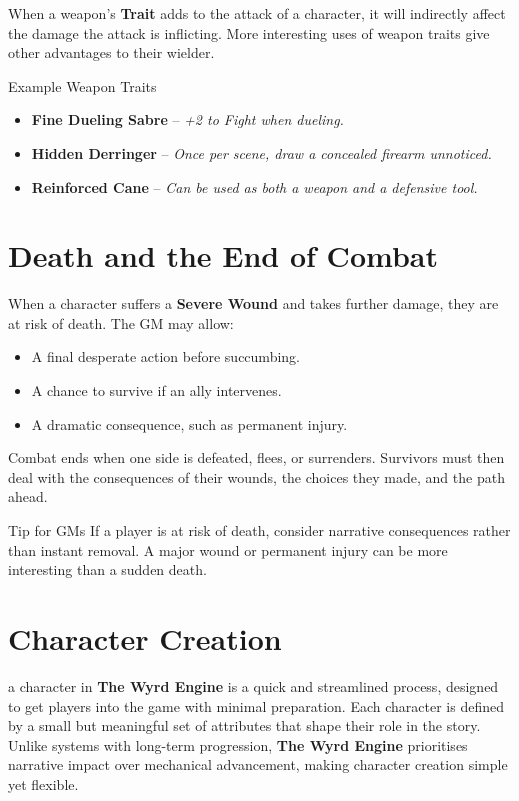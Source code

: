 When a weapon's \textbf{Trait} adds to the attack of a character, it will indirectly affect the damage the attack is inflicting. More interesting uses of weapon traits give other advantages to their wielder.

\begin{DndReadAloud}{Example Weapon Traits}
\begin{itemize}
    \item \textbf{Fine Dueling Sabre} – \textit{+2 to Fight when dueling.}
    \item \textbf{Hidden Derringer} – \textit{Once per scene, draw a concealed firearm unnoticed.}
    \item \textbf{Reinforced Cane} – \textit{Can be used as both a weapon and a defensive tool.}
\end{itemize}
\end{DndReadAloud}

\section{Death and the End of Combat}
When a character suffers a \textbf{Severe Wound} and takes further damage, they are at risk of death. The GM may allow:
\begin{itemize}
    \item A final desperate action before succumbing.
    \item A chance to survive if an ally intervenes.
    \item A dramatic consequence, such as permanent injury.
\end{itemize}

Combat ends when one side is defeated, flees, or surrenders. Survivors must then deal with the consequences of their wounds, the choices they made, and the path ahead.

\begin{DndComment}{Tip for GMs}
If a player is at risk of death, consider narrative consequences rather than instant removal. A major wound or permanent injury can be more interesting than a sudden death.
\end{DndComment}




\section{Character Creation}

 a character in \textbf{The Wyrd Engine} is a quick and streamlined process, designed to get players into the game with minimal preparation. Each character is defined by a small but meaningful set of attributes that shape their role in the story. Unlike systems with long-term progression, \textbf{The Wyrd Engine} prioritises narrative impact over mechanical advancement, making character creation simple yet flexible.


